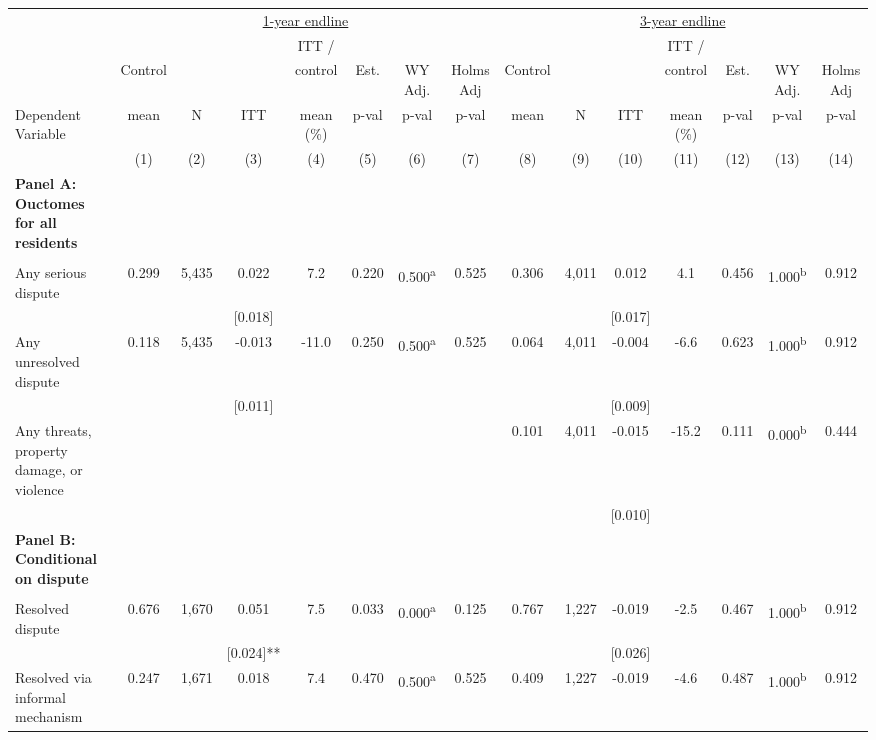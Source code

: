 \begin{tabular}{lcccccccccccccc}
\hline \noalign{\smallskip} & \multicolumn{7}{c}{\uline{\hfill 1-year endline \hfill}} & \multicolumn{7}{c}{\uline{\hfill 3-year endline \hfill}}\\
 &  &  &  & ITT / &  &  &  &  &  &  & ITT / &  &  & \\
 & Control &  &  & control & Est. & WY Adj. & Holms Adj & Control &  &  & control & Est. & WY Adj. & Holms Adj\\
Dependent Variable & mean & N & ITT & mean (\%) & p-val & p-val & p-val & mean & N & ITT & mean (\%) & p-val & p-val & p-val\\
 & (1) & (2) & (3) & (4) & (5) & (6) & (7) & (8) & (9) & (10) & (11) & (12) & (13) & (14)\\
\noalign{\smallskip}\hline \noalign{\smallskip}\textbf{Panel A: Ouctomes for all residents} &  &  &  &  &  &  &  &  &  &  &  &  &  & \\
 &  &  &  &  &  &  &  &  &  &  &  &  &  & \\
Any serious dispute & 0.299 & 5,435 & 0.022 & 7.2 & 0.220 & 0.500\textsuperscript{a} & 0.525 & 0.306 & 4,011 & 0.012 & 4.1 & 0.456 & 1.000\textsuperscript{b} & 0.912\\
 &  &  & [0.018] &  &  &  &  &  &  & [0.017] &  &  &  & \\
Any unresolved dispute & 0.118 & 5,435 & -0.013 & -11.0 & 0.250 & 0.500\textsuperscript{a} & 0.525 & 0.064 & 4,011 & -0.004 & -6.6 & 0.623 & 1.000\textsuperscript{b} & 0.912\\
 &  &  & [0.011] &  &  &  &  &  &  & [0.009] &  &  &  & \\
\phantom{} Any threats, property damage, or violence &  &  &  &  &  &  &  & 0.101 & 4,011 & -0.015 & -15.2 & 0.111 & 0.000\textsuperscript{b} & 0.444\\
 &  &  &  &  &  &  &  &  &  & [0.010] &  &  &  & \\
\textbf{Panel B: Conditional on dispute} &  &  &  &  &  &  &  &  &  &  &  &  &  & \\
 &  &  &  &  &  &  &  &  &  &  &  &  &  & \\
Resolved dispute & 0.676 & 1,670 & 0.051 & 7.5 & 0.033 & 0.000\textsuperscript{a} & 0.125 & 0.767 & 1,227 & -0.019 & -2.5 & 0.467 & 1.000\textsuperscript{b} & 0.912\\
 &  &  & [0.024]** &  &  &  &  &  &  & [0.026] &  &  &  & \\
\quad Resolved via informal mechanism & 0.247 & 1,671 & 0.018 & 7.4 & 0.470 & 0.500\textsuperscript{a} & 0.525 & 0.409 & 1,227 & -0.019 & -4.6 & 0.487 & 1.000\textsuperscript{b} & 0.912\\

\end{tabular}
